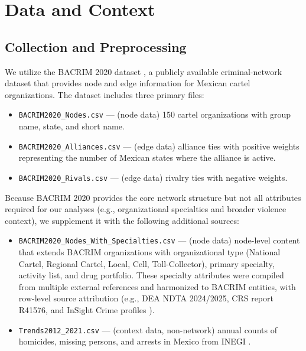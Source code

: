 \documentclass[11pt, a4paper]{article}
\begin{document}
\section{Data and Context}\label{sec:data_main}

\subsection{Collection and Preprocessing}\label{sec:data}

We utilize the BACRIM 2020 dataset \citep{prietocuriel2023bacrim}, a publicly available criminal-network dataset that provides node and edge information for Mexican cartel organizations. The dataset includes three primary files:

\begin{itemize}[leftmargin=2em]
    \item \texttt{BACRIM2020\_Nodes.csv} --- (node data) 150 cartel organizations with group name, state, and short name.
    \item \texttt{BACRIM2020\_Alliances.csv} --- (edge data) alliance ties with positive weights representing the number of Mexican states where the alliance is active.
    \item \texttt{BACRIM2020\_Rivals.csv} --- (edge data) rivalry ties with negative weights.
\end{itemize}

\noindent Because BACRIM 2020 provides the core network structure but not all attributes required for our analyses (e.g., organizational specialties and broader violence context), we supplement it with the following additional sources:

\begin{itemize}[leftmargin=2em]
    \item \texttt{BACRIM2020\_Nodes\_With\_Specialties.csv} --- (node data) node-level content that extends BACRIM organizations with organizational type (National Cartel, Regional Cartel, Local, Cell, Toll-Collector), primary specialty, activity list, and drug portfolio. These specialty attributes were compiled from multiple external references and harmonized to BACRIM entities, with row-level source attribution (e.g., DEA NDTA 2024/2025, CRS report R41576, and InSight Crime profiles \citep{dea2024,dea2025,crsR41576,insightcrimeProfiles}).
    \item \texttt{Trends2012\_2021.csv} --- (context data, non-network) annual counts of homicides, missing persons, and arrests in Mexico from INEGI \citep{inegi2022}.
\end{itemize}
\end{document}
